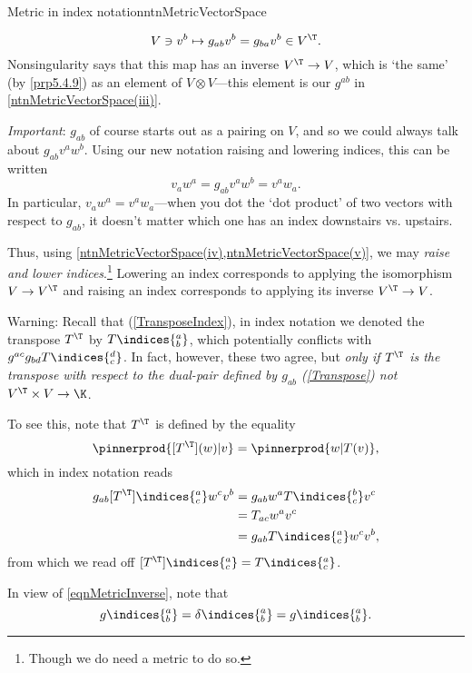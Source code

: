 \begin{ntn}{Metric in index notation}{ntnMetricVectorSpace}
\begin{rmk}
		\begin{equation}
			V\ni v^b\mapsto g_{ab}v^b=g_{ba}v^b\in V^{\T}.
		\end{equation}
		Nonsingularity says that this map has an inverse $V^{\T}\rightarrow V$, which is `the same' (by \cref{prp5.4.9}) as an element of $V\otimes V$---this element is our $g^{ab}$ in \cref{ntnMetricVectorSpace(iii)}.
	\end{rmk}
	\begin{rmk}
		\emph{Important}:  $g_{ab}$ of course starts out as a pairing on $V$, and so we could always talk about $g_{ab}v^aw^b$.  Using our new notation raising and lowering indices, this can be written
		\begin{equation}
			v_aw^a=g_{ab}v^aw^b=v^aw_a.
		\end{equation}
		In particular, $v_aw^a=v^aw_a$---when you dot the `dot product' of two vectors with respect to $g_{ab}$, it doesn't matter which one has an index downstairs vs. upstairs.
	\end{rmk}
	\begin{rmk}
		Thus, using \cref{ntnMetricVectorSpace(iv),ntnMetricVectorSpace(v)}, we may \emph{raise and lower indices}.\footnote{Though we do need a metric to do so.}  Lowering an index corresponds to applying the isomorphism $V\rightarrow V^{\T}$ and raising an index corresponds to applying its inverse $V^{\T}\rightarrow V$.
	\end{rmk}
	\begin{rmk}
		Warning:  Recall that (\cref{TransposeIndex}), in index notation we denoted the transpose $T^{\T}$ by $T\indices{_b^a}$, which potentially conflicts with $g^{ac}g_{bd}T\indices{^d_c}$.  In fact, however, these two agree, but \emph{only if $T^{\T}$ is the transpose with respect to the dual-pair defined by $g_{ab}$ (\cref{Transpose}) not $V^{\T}\times V\rightarrow \K$}.
		
		To see this, note that $T^{\T}$ is defined by the equality
		\begin{equation}
			\pinnerprod{[T^{\T}](w)|v}=\pinnerprod{w|T(v)},
		\end{equation}
		which in index notation reads
		\begin{equation}
			\begin{split}
				g_{ab}[T^{\T}]\indices{^a_c}w^cv^b & =g_{ab}w^aT\indices{^b_c}v^c \\
				& =T_{ac}w^av^c \\
				& =g_{ab}T\indices{_c^a}w^cv^b,
			\end{split}
		\end{equation}
		from which we read off $[T^{\T}]\indices{^a_c}=T\indices{_c^a}$.
	\end{rmk}
	\begin{rmk}
		In view of \eqref{eqnMetricInverse}, note that
		\begin{equation}
			g\indices{^a_b}=\delta \indices{^a_b}=g\indices{_b^a}.
		\end{equation}
	\end{rmk}
\end{ntn}
